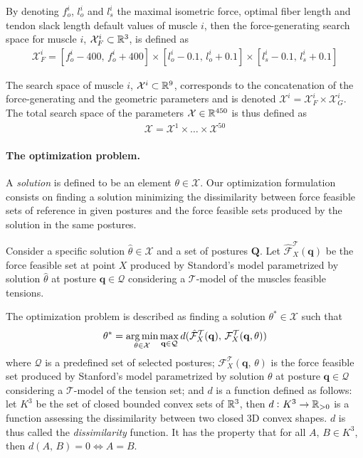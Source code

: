 By denoting $f_o^i$, $l_o^i$ and $l_s^i$ the maximal isometric force, optimal fiber length and tendon slack length default values of muscle $i$, then the force-generating search space for muscle $i$, $\mathcal{X}_F^i \subset \mathbb{R}^3$, is defined as 
\begin{align*}
    \mathcal{X}_F^i = [f_o^i - 400,\, f_o^i + 400] \times [l_o^i - 0.1,\, l_o^i + 0.1] \times [l_s^i - 0.1,\, l_s^i + 0.1]
\end{align*}

The search space of muscle $i$, $\mathcal{X}^i \subset \mathbb{R}^{9}$, corresponds to the concatenation of the force-generating and the geometric parameters and is denoted $\mathcal{X}^i = \mathcal{X}_F^i\times \mathcal{X}_G^i$. The total search space of the parameters $\mathcal{X}\in \mathbb{R}^{450}$ is thus defined as
\begin{align*}
    \mathcal{X} = \mathcal{X}^1 \times \dots \times \mathcal{X}^{50}
\end{align*} 

\paragraph*{The optimization problem.}
A \emph{solution} is defined to be an element $\theta \in \mathcal{X}$. Our optimization formulation consists on finding a solution minimizing the dissimilarity between force feasible sets of reference in given postures and the force feasible sets produced by the solution in the same postures.

Consider a specific solution $\hat{\theta}\in\mathcal{X}$ and a set of postures $\mathbf{Q}$. Let $\hat{\mathcal{F}}_X^{\mathcal{T}}(\mathbf{q})$ be the force feasible set  at point $X$ produced by Standord's model parametrized by solution $\hat{\theta}$ at posture $\mathbf{q} \in \mathcal{Q}$ considering a $\mathcal{T}$-model of the muscles feasible tensions.

The optimization problem is described as finding a solution $\theta^*\in\mathcal{X}$ such that 
\begin{align}
    \label{eq:opt_prb}
    \theta^* = \operatorname*{arg\,min}_{\theta \in \mathcal{X}} \max_{\mathbf{q}\in\mathcal{Q}} d(\hat{\mathcal{F}}_X^{\mathcal{T}}(\mathbf{q}),\, \mathcal{F}_X^{\mathcal{T}}(\mathbf{q}, \theta))
\end{align}
where $\mathcal{Q}$ is a predefined set of selected postures; $\mathcal{F}_X^{\mathcal{T}}(\mathbf{q},\, \theta)$ is the force feasible set produced by Stanford's model parametrized by solution $\theta$ at posture $\mathbf{q}\in\mathcal{Q}$ considering a $\mathcal{T}$-model of the tension set; and $d$ is a function defined as follows:
let $K^3$ be the set of closed bounded convex sets of $\mathbb{R}^3$, then
$d\,\colon K^3\to \mathbb{R}_{>0}$ is a function assessing the dissimilarity between two closed 3D convex shapes. $d$ is thus called the \emph{dissimilarity} function. It has the property that for all $A,\, B \in K^3$, then $d(A,\, B) = 0 \iff A = B$.

